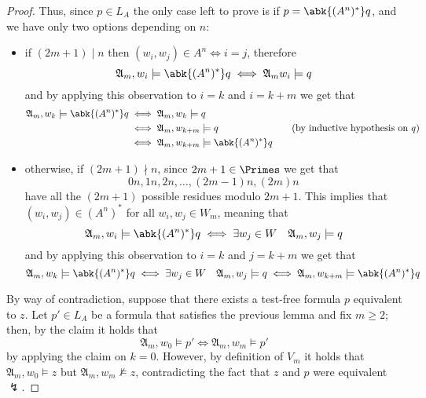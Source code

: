 \documentclass[a4paper, 12pt]{report}
\begin{document}
\begin{proof}
{            Thus, since $p \in L_A$ the only case left to prove is if $p = \abk {(A^n)^*}q$, and we have only two options depending on $n$:

            \begin{itemize}
                \item if $(2m + 1) \mid n$ then $(w_i, w_j) \in A^n \iff i = j$, therefore $$\mathfrak A_m, w_i \models \abk{(A^n)^*}q \iff \mathfrak A_m w_i \models q$$ and by applying this observation to $i = k$ and $i = k + m$ we get that
                    \begin{equation*}
                        \begin{alignedat}{2}
                            \mathfrak A_m, w_k \models \abk{(A^n)^*}q &\iff \mathfrak A_m, w_k \models q && \\
                                                                      &\iff \mathfrak A_m, w_{k + m} \models q && \quad \quad (\mbox{by inductive hypothesis on $q$})\\
                                                                      &\iff \mathfrak A_m, w_{k + m} \models \abk{(A^n)^*}q &&
                        \end{alignedat}
                    \end{equation*}
                \item otherwise, if $(2m + 1) \nmid n$, since $2m + 1 \in \Primes$ we get that $$0n, 1n, 2n, \ldots, (2m - 1)n, (2m)n$$ have all the $(2m + 1)$ possible residues modulo $2m + 1$. This implies that $(w_i, w_j) \in (A^n)^*$ for all $w_i, w_j \in W_m$, meaning that $$\mathfrak A_m, w_i \models \abk{(A^n)^*}q \iff \exists w_j \in W \quad \mathfrak A_m, w_j \models q$$ and by applying this observation to $i = k$ and $j = k + m$ we get that $$\mathfrak A_m, w_k \models \abk{(A^n)^*}q \iff \exists w_j \in W \quad \mathfrak A_m, w_j \models q \iff \mathfrak A_m, w_{k + m} \models \abk{(A^n)^*}q$$
            \end{itemize}
        }

        By way of contradiction, suppose that there exists a test-free formula $p$ equivalent to $z$. Let $p' \in L_A$ be a formula that satisfies the previous lemma and fix $m \ge 2$; then, by the claim it holds that $$\mathfrak A_m, w_0 \models p' \iff \mathfrak A_m, w_{m} \models p'$$ by applying the claim on $k = 0$. However, by definition of $V_m$ it holds that $\mathfrak A_m, w_0 \models z$ but $\mathfrak A_m, w_m \not\models z$, contradicting the fact that $z$ and $p$ were equivalent $\lightning$.
    \end{proof}
\end{document}
